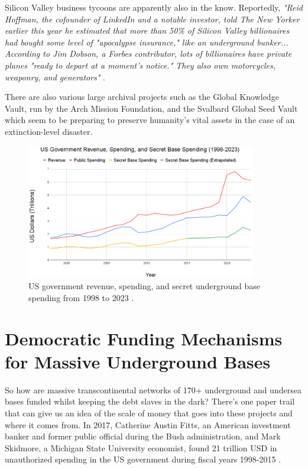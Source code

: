 \documentclass[10pt,twocolumn,letterpaper]{article}
\begin{document}
Silicon Valley business tycoons are apparently also in the know. Reportedly, \textit{"Reid Hoffman, the cofounder of LinkedIn and a notable investor, told The New Yorker earlier this year he estimated that more than 50\% of Silicon Valley billionaires had bought some level of "apocalypse insurance," like an underground bunker... According to Jim Dobson, a Forbes contributor, lots of billionaires have private planes "ready to depart at a moment's notice." They also own motorcycles, weaponry, and generators"} \cite{28}.

There are also various large archival projects such as the Global Knowledge Vault, run by the Arch Mission Foundation, \cite{29} and the Svalbard Global Seed Vault \cite{30} which seem to be preparing to preserve humanity's vital assets in the case of an extinction-level disaster.

\begin{figure}[t]
\begin{center}
\includegraphics[width=0.9\textwidth]{govcrop2.png}
\end{center}
   \caption{US government revenue, spending, and secret underground base spending from 1998 to 2023 \cite{19}.}
   \label{fig:9}
\end{figure}

\section{Democratic Funding Mechanisms for Massive Underground Bases}

So how are massive transcontinental networks of 170+ underground and undersea bases funded whilst keeping the debt slaves in the dark? There's one paper trail that can give us an idea of the scale of money that goes into these projects and where it comes from. In 2017, Catherine Austin Fitts, an American investment banker and former public official during the Bush administration, and Mark Skidmore, a Michigan State University economist, found 21 trillion USD in unauthorized spending in the US government during fiscal years 1998-2015 \cite{11,12,13}.
\end{document}
